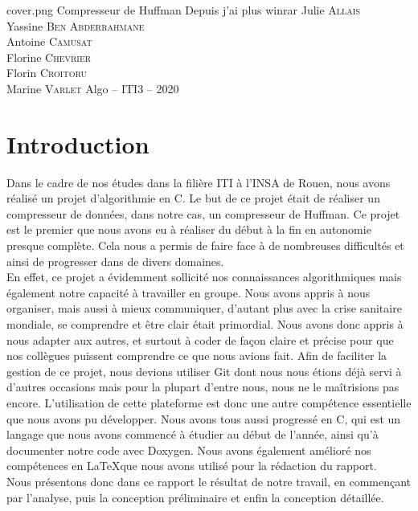 \documentclass{article}
\begin{document}
\PageDeGarde
{cover.png} %
{Compresseur de Huffman} %
{Depuis j'ai plus winrar} %
{Julie \textsc{Allais}\\
Yassine \textsc{Ben Abderrahmane}\\
Antoine \textsc{Camusat}\\
Florine \textsc{Chevrier}\\
Florin \textsc{Croitoru}\\
Marine \textsc{Varlet}} %
{Algo – ITI3 – 2020} %



\tableofcontents

\clearpage %
\section{Introduction} %
Dans le cadre de nos études dans la filière ITI à l’INSA de Rouen, nous avons réalisé un projet d’algorithmie en C. Le but de ce projet était de réaliser un compresseur de données, dans notre cas, un compresseur de Huffman. Ce projet est le premier que nous avons eu à réaliser du début à la fin en autonomie presque complète. Cela nous a permis de faire face à de nombreuses difficultés et ainsi de progresser dans de divers domaines. \\
En effet, ce projet a évidemment sollicité nos connaissances algorithmiques mais également notre capacité à travailler en groupe. Nous avons appris à nous organiser, mais aussi à mieux communiquer, d’autant plus avec la crise sanitaire mondiale, se comprendre et être clair était primordial. Nous avons donc appris à nous adapter aux autres, et surtout à coder de façon claire et précise pour que nos collègues puissent comprendre ce que nous avions fait. Afin de faciliter la gestion de ce projet, nous devions utiliser Git dont nous nous étions déjà servi à d’autres occasions mais pour la plupart d’entre nous, nous ne le maîtrisions pas encore. L’utilisation de cette plateforme est donc une autre compétence essentielle que nous avons pu développer. Nous avons tous aussi progressé en C, qui est un langage que nous avons commencé à étudier au début de l’année, ainsi qu’à documenter notre code avec Doxygen. Nous avons également amélioré nos compétences en \LaTeX que nous avons utilisé pour la rédaction du rapport. \\
Nous présentons donc dans ce rapport le résultat de notre travail, en commençant par l'analyse, puis la conception préliminaire et enfin la conception détaillée.
\end{document}
